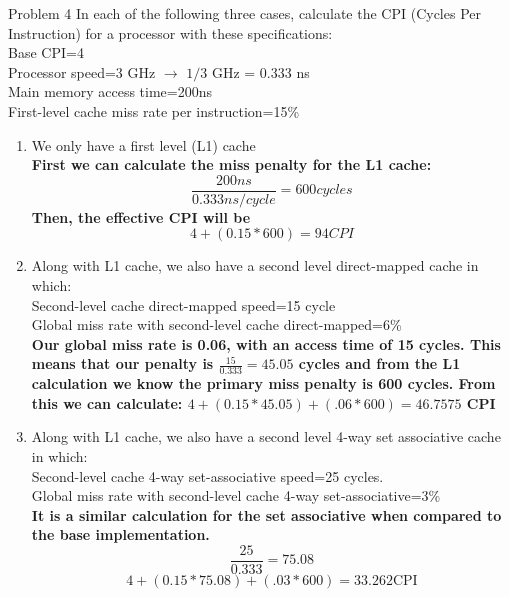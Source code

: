 	\begin{problem}{}{Problem 4}
		In each of the following three cases, calculate the CPI (Cycles Per Instruction) for a processor with these
		specifications:\\
		Base CPI=4\\
		Processor speed=3 GHz $\rightarrow$ $1/3$ GHz = $0.333$ ns \\
		Main memory access time=200ns\\
		First-level cache miss rate per instruction=15\%
		\begin{enumerate}[label=(\alph*)]
			\item We only have a first level (L1) cache\\
			\textbf{First we can calculate the miss penalty for the L1 cache: \[ \frac{200 ns}{0.333 ns/cycle} = 600 cycles\] Then, the effective CPI will be \[ 4 + (0.15*600) = 94 CPI \]}
			\item Along with L1 cache, we also have a second level direct-mapped cache in which:\\
			Second-level cache direct-mapped speed=15 cycle\\
			Global miss rate with second-level cache direct-mapped=6\%\\
			\textbf{Our global miss rate is 0.06, with an access time of 15 cycles. This means that our penalty is $\frac{15}{0.333} = 45.05$ cycles and from the L1 calculation we know the primary miss penalty is 600 cycles. From this we can calculate: $4+ (0.15*45.05) + (.06 * 600) = 46.7575$ CPI }
			\item Along with L1 cache, we also have a second level 4-way set associative cache in which:\\
			Second-level cache 4-way set-associative speed=25 cycles.\\
			Global miss rate with second-level cache 4-way set-associative=3\%\\
			\textbf{It is a similar calculation for the set associative when compared to the base implementation. 
			\[\frac{25}{0.333} = 75.08 \]
			\[4+ (0.15*75.08) + (.03 * 600) = 33.262 \text{CPI}\]}
		\end{enumerate}
	\end{problem}

